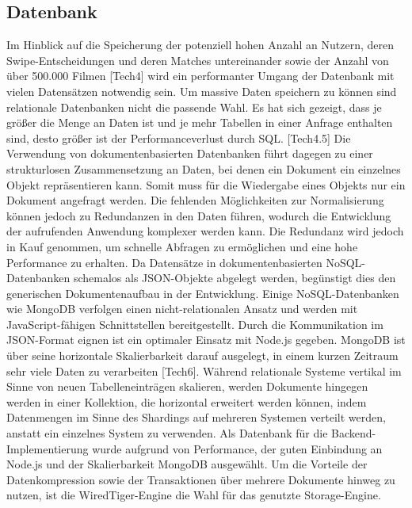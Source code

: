 \subsection{Datenbank}
Im Hinblick auf die Speicherung der potenziell hohen Anzahl an Nutzern, deren Swipe-Ent\-schei\-dungen und deren Matches untereinander sowie der Anzahl von über 500.000 Filmen [Tech4] wird ein performanter Umgang der Datenbank mit vielen Datensätzen notwendig sein.  
Um massive Daten speichern zu können sind relationale Datenbanken nicht die passende Wahl. 
Es hat sich gezeigt, dass je größer die Menge an Daten ist und je mehr Tabellen in einer Anfrage enthalten sind, desto größer ist der Performanceverlust durch SQL. [Tech4.5]
\newline
Die Verwendung von dokumentenbasierten Datenbanken führt dagegen zu einer strukturlosen Zusammensetzung an Daten, bei denen ein Dokument ein einzelnes Objekt repräsentieren kann. 
Somit muss für die Wiedergabe eines Objekts nur ein Dokument angefragt werden. Die fehlenden Möglichkeiten zur Normalisierung können jedoch zu Redundanzen in den Daten führen, wodurch die Entwicklung der aufrufenden Anwendung komplexer werden kann. 
Die Redundanz wird jedoch in Kauf genommen, um schnelle Abfragen zu ermöglichen und eine hohe Performance zu erhalten. Da Datensätze in dokumentenbasierten NoSQL-Datenbanken schemalos als JSON-Objekte abgelegt werden, begünstigt dies den generischen Dokumentenaufbau in der Entwicklung.
\newline
Einige NoSQL-Datenbanken wie MongoDB verfolgen einen nicht-relationalen Ansatz und werden mit JavaScript-fähigen Schnittstellen bereitgestellt. Durch die Kommunikation im JSON-Format eignen ist ein optimaler Einsatz mit Node.js gegeben. MongoDB ist über seine horizontale Skalierbarkeit darauf ausgelegt, in einem kurzen Zeitraum sehr viele Daten zu verarbeiten [Tech6]. Während relationale Systeme vertikal im Sinne von neuen Tabelleneinträgen skalieren, werden Dokumente hingegen werden in einer Kollektion, die horizontal erweitert werden können, indem Datenmengen im Sinne des Shardings auf mehreren Systemen verteilt werden, anstatt ein einzelnes System zu verwenden.
\newline
Als Datenbank für die Backend-Implementierung wurde aufgrund von Performance, der guten Einbindung an Node.js und der Skalierbarkeit MongoDB ausgewählt. Um die Vorteile der Da\-ten\-kompression sowie der Transaktionen über mehrere Dokumente hinweg zu nutzen, ist die WiredTiger-Engine die Wahl für das genutzte Storage-Engine.  



